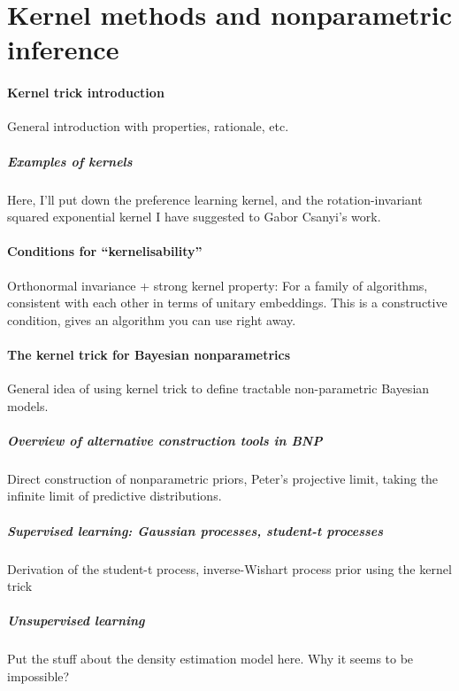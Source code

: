 \part{Kernel methods and nonparametric inference}
\subsection{Kernel trick introduction}
General introduction with properties, rationale, etc.
\subsubsection{Examples of kernels}
Here, I'll put down the preference learning kernel, and the rotation-invariant squared exponential kernel I have suggested to Gabor Csanyi's work.
\subsection{Conditions for ``kernelisability''}
Orthonormal invariance + strong kernel property: For a family of algorithms, consistent with each other in terms of unitary embeddings. This is a constructive condition, gives an algorithm you can use right away.
\subsection{The kernel trick for Bayesian nonparametrics}
General idea of using kernel trick to define tractable non-parametric Bayesian models.
\subsubsection{Overview of alternative construction tools in BNP}
Direct construction of nonparametric priors, Peter's projective limit, taking the infinite limit of predictive distributions.
\subsubsection{Supervised learning: Gaussian processes, student-t processes}
Derivation of the student-t process, inverse-Wishart process prior using the kernel trick
\subsubsection{Unsupervised learning}
Put the stuff about the density estimation model here. Why it seems to be impossible?\\
